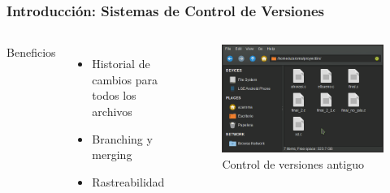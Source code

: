 \documentclass{beamer}
\title{\resizebox{\columnwidth}{!}{%
    {\FiraTitle%
    \texorpdfstring{\textcolor{black}{Git}}{Git}%
    \texorpdfstring{\textcolor{green}{+}}{+}%
    \texorpdfstring{Github}{Github}%
}}}
\author{\FiraTitle%
  \texorpdfstring{\textcolor{black}{Mario Alejandro Gil Lázaro}}{}
}
\date{}
\begin{document}
\frame{\titlepage}

\begin{frame}
  \frametitle{{\FiraTitle \textbf{Introducción: Sistemas de Control de Versiones}}}
  \begin{columns}
    {\FiraTitle Beneficios}
    \begin{itemize}
      \item Historial de cambios para todos los archivos
      \item Branching y merging
      \item Rastreabilidad
      \end{itemize}
    \begin{figure}
      \centering
      \includegraphics[width=\textwidth]{version}
      \caption{Control de versiones antiguo}
    \end{figure}
  \end{columns}
\end{frame}
\end{document}
